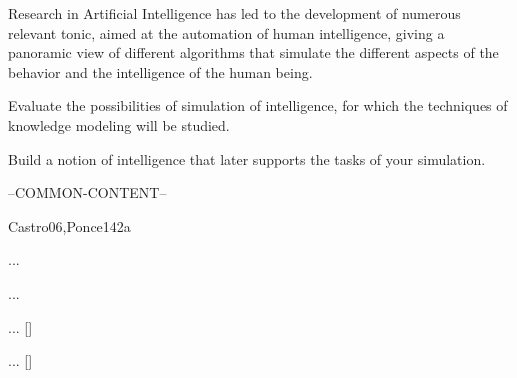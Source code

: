 \begin{syllabus}


\begin{justification}
Research in Artificial Intelligence has led to the development of numerous relevant tonic, aimed at the automation of human intelligence, giving a panoramic view of different
algorithms that simulate the different aspects of the behavior and the intelligence of the human being.
\end{justification}

\begin{goals}
\item Evaluate the possibilities of simulation of intelligence, for which the techniques of knowledge modeling will be studied.
\item Build a notion of intelligence that later supports the tasks of your simulation.
\end{goals}

--COMMON-CONTENT--

\begin{unit}{\ISFundamentalIssues}{}{Castro06,Ponce14}{2}{a}
    \begin{topics}
        \item ...
        \item ...
    \end{topics}
    \begin{learningoutcomes}
        \item ... [\Usage]
        \item ... [\Usage]
    \end{learningoutcomes}
\end{unit}


\begin{coursebibliography}
\end{coursebibliography}

\end{syllabus}
